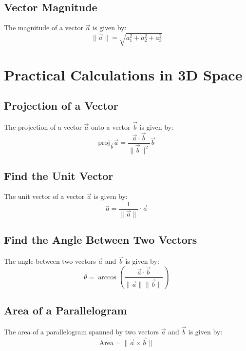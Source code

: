 \documentclass{article}
\begin{document}
\subsection{Vector Magnitude}
The magnitude of a vector $\vec{a}$ is given by:
\begin{equation}
    \lVert \vec{a} \rVert = \sqrt{a_1^2 + a_2^2 + a_3^2}
\end{equation}

\newpage

\section{Practical Calculations in 3D Space}

\subsection{Projection of a Vector}
The projection of a vector $\vec{a}$ onto a vector $\vec{b}$ is given by:
\begin{equation}
    \text{proj}_{\vec{b}} \vec{a} = \frac{\vec{a} \cdot \vec{b}}{\lVert \vec{b} \rVert^2} \vec{b}
\end{equation}

\subsection{Find the Unit Vector}
The unit vector of a vector $\vec{a}$ is given by:
\begin{equation}
    \hat{a} = \frac{1}{\lVert \vec{a} \rVert} \cdot \vec{a}
\end{equation}

\subsection{Find the Angle Between Two Vectors}
The angle between two vectors $\vec{a}$ and $\vec{b}$ is given by:
\begin{equation}
    \theta = \arccos \left( \frac{\vec{a} \cdot \vec{b}}{\lVert \vec{a} \rVert \lVert \vec{b} \rVert} \right)
\end{equation}

\subsection{Area of a Parallelogram}
The area of a parallelogram spanned by two vectors $\vec{a}$ and $\vec{b}$ is given by:
\begin{equation}
    \text{Area} = \lVert \vec{a} \times \vec{b} \rVert
\end{equation}
\end{document}
